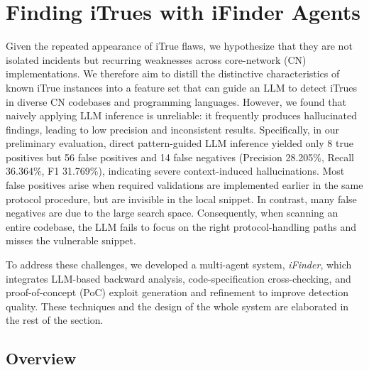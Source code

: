 \section{Finding iTrues with iFinder Agents}


Given the repeated appearance of iTrue flaws, we hypothesize that they are not isolated incidents but recurring weaknesses across core-network (CN) implementations. We therefore aim to distill the distinctive characteristics of known iTrue instances into a feature set that can guide an LLM to detect iTrues in diverse CN codebases and programming languages. However, we found that naively applying LLM inference is unreliable: it frequently produces hallucinated findings, leading to low precision and inconsistent results. Specifically, in our preliminary evaluation, direct pattern-guided LLM inference yielded only 8 true positives but 56 false positives and 14 false negatives (Precision 28.205\%, Recall 36.364\%, F1 31.769\%), indicating severe context-induced hallucinations. Most false positives arise when required validations are implemented earlier in the same protocol procedure, but are invisible in the local snippet. In contrast, many false negatives are due to the large search space. Consequently, when scanning an entire codebase, the LLM fails to focus on the right protocol-handling paths and misses the vulnerable snippet. 

To address these challenges, we developed a multi-agent system, \textit{iFinder}, which integrates LLM-based backward analysis, code-specification cross-checking, and proof-of-concept (PoC) exploit generation and refinement to improve detection quality. These techniques and the design of the whole system are elaborated in the rest of the section.

\subsection{Overview}

